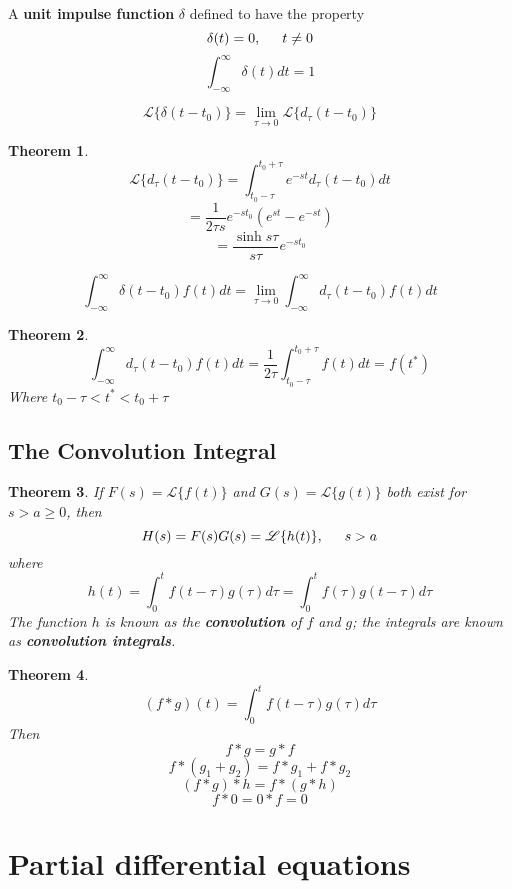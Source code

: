 \documentclass[letter]{article}
\newcommand{\laplace}[1]{\mathscr{L}\{#1\}}
\newtheorem{theorem}{Theorem}[section]
\newenvironment{definition}[1][Definition]{\begin{trivlist}
\item[\hskip \labelsep {\bfseries #1}]}{\end{trivlist}}
\begin{document}
\begin{definition}
A \textbf{unit impulse function} $\delta$ defined to have the property
\[\delta(t) = 0,\indent t\neq 0\]
\[\int_{-\infty}^{\infty} \delta(t) dt = 1\]
\end{definition}

\begin{definition}
\[\laplace{\delta(t-t_0)} = \lim_{\tau\to 0} \laplace{d_\tau (t-t_0)} \]
\end{definition}

\begin{theorem}
\[\laplace{d_\tau (t-t_0)} = \int_{t_0-\tau}^{t_0+\tau} e^{-st}d_\tau(t-t_0) dt \]
\[ = \frac{1}{2\tau s} e^{-st_0} (e^{st} - e ^{-st}) \]
\[=\frac{\sinh s\tau}{s\tau} e^{-st_0}\]
\end{theorem}

\begin{definition}
\[\int_{-\infty}^{\infty} \delta(t-t_0) f(t) dt = \lim_{\tau\to 0} \int_{-\infty}^{\infty} d_\tau(t-t_0) f(t) dt\]
\end{definition}

\begin{theorem}
\[ \int_{-\infty}^{\infty} d_\tau(t-t_0) f(t) dt = \frac{1}{2\tau}\int_{t_0-\tau}^{t_0+\tau} f(t) dt = f(t^*)\]
Where $t_0-\tau<t^*<t_0+\tau$
\end{theorem}

\subsection{The Convolution Integral}
\begin{theorem}
If $F(s) = \laplace{f(t)}$ and $G(s) = \laplace{g(t)}$ both exist for $s>a\geq 0$, then
\[H(s) = F(s)G(s) = \laplace{h(t)}, \indent s>a \]
where
\[ h(t) = \int_0^t f(t-\tau)g(\tau) d\tau = \int_0^t f(\tau)g(t-\tau) d\tau \] 
The function $h$ is known as the \textbf{convolution} of $f$ and $g$; the integrals are known as \textbf{convolution integrals}.
\end{theorem}

\begin{theorem}
\[(f * g)(t) = \int_0^t f(t-\tau)g(\tau) d\tau\]
Then
\[f*g = g*f\]
\[f*(g_1+g_2) = f*g_1 + f*g_2\]
\[(f*g)*h = f*(g*h)\]
\[f*0 = 0*f = 0\]
\end{theorem}

\section{Partial differential equations}
\end{document}

